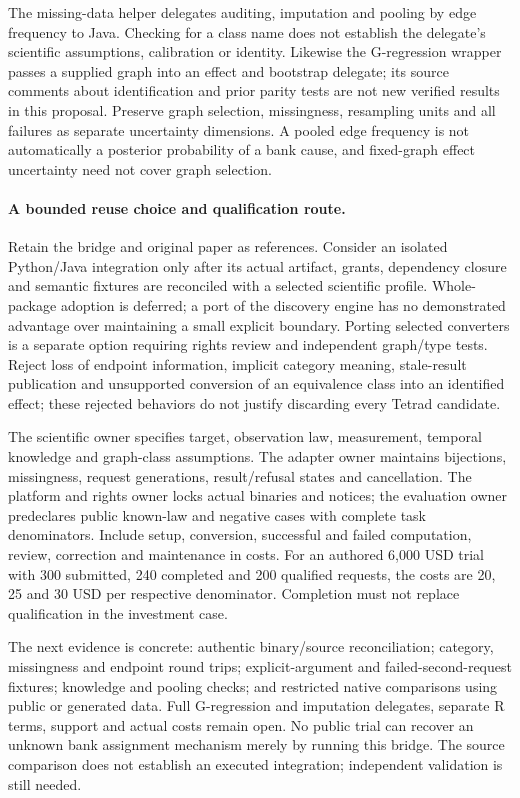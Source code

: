 The missing-data helper delegates auditing, imputation and pooling by edge
frequency to Java. Checking for a class name does not establish the delegate's
scientific assumptions, calibration or identity. Likewise the G-regression
wrapper passes a supplied graph into an effect and bootstrap delegate; its
source comments about identification and prior parity tests are not new
verified results in this proposal. Preserve graph selection, missingness,
resampling units and all failures as separate uncertainty dimensions. A pooled
edge frequency is not automatically a posterior probability of a bank cause,
and fixed-graph effect uncertainty need not cover graph selection.
\citep{exec24_pytetrad_source}

\paragraph{A bounded reuse choice and qualification route.}
Retain the bridge and original paper as references. Consider an isolated
Python/Java integration only after its actual artifact, grants, dependency
closure and semantic fixtures are reconciled with a selected scientific
profile. Whole-package adoption is deferred; a port of the discovery engine
has no demonstrated advantage over maintaining a small explicit boundary.
Porting selected converters is a separate option requiring rights review and
independent graph/type tests. Reject loss of endpoint information, implicit
category meaning, stale-result publication and unsupported conversion of an
equivalence class into an identified effect; these rejected behaviors do not
justify discarding every Tetrad candidate.\citep{exec24_pytetrad_choice}

The scientific owner specifies target, observation law, measurement, temporal
knowledge and graph-class assumptions. The adapter owner maintains bijections,
missingness, request generations, result/refusal states and cancellation. The
platform and rights owner locks actual binaries and notices; the evaluation
owner predeclares public known-law and negative cases with complete task
denominators. Include setup, conversion, successful and failed computation,
review, correction and maintenance in costs. For an authored 6,000 USD trial
with 300 submitted, 240 completed and 200 qualified requests, the costs are
20, 25 and 30 USD per respective denominator. Completion must not replace
qualification in the investment case.\citep{exec24_pytetrad_choice}

The next evidence is concrete: authentic binary/source reconciliation;
category, missingness and endpoint round trips; explicit-argument and
failed-second-request fixtures; knowledge and pooling checks; and restricted
native comparisons using public or generated data. Full G-regression and
imputation delegates, separate R terms, support and actual costs remain open.
No public trial can recover an unknown bank assignment mechanism merely by
running this bridge. The source comparison does not establish an executed integration; independent validation is still needed.
